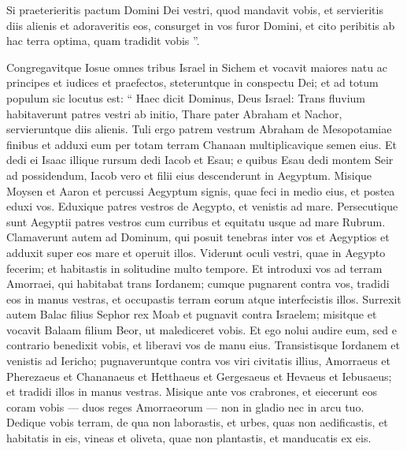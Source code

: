 \begin{biblechapter}
\begin{biblechapter}
\begin{biblechapter}
\begin{biblechapter}
\begin{biblechapter}
\begin{biblechapter}
\begin{biblechapter}
\begin{biblechapter}
\begin{biblechapter}
\begin{biblechapter}
\begin{biblechapter}
\begin{biblechapter}
\begin{biblechapter}
\begin{biblechapter}
\begin{biblechapter}
\begin{biblechapter}
\begin{biblechapter}
\begin{biblechapter}
\begin{biblechapter}
\begin{biblechapter}
\begin{biblechapter}
\begin{biblechapter}
\begin{biblechapter}
 \verse Si praeterieritis pactum Domini Dei vestri, quod mandavit vobis, et servieritis diis alienis et adoraveritis eos, consurget in vos furor Domini, et cito peribitis ab hac terra optima, quam tradidit vobis ”.
 
\begin{biblechapter}
\verse Congregavitque Iosue omnes tribus Israel in Sichem et vocavit maiores natu ac principes et iudices et praefectos, steteruntque in conspectu Dei; 
\verse et ad totum populum sic locutus est: “ Haec dicit Dominus, Deus Israel: Trans fluvium habitaverunt patres vestri ab initio, Thare pater Abraham et Nachor, servieruntque diis alienis. 
\verse Tuli ergo patrem vestrum Abraham de Mesopotamiae finibus et adduxi eum per totam terram Chanaan multiplicavique semen eius. 
\verse Et dedi ei Isaac illique rursum dedi Iacob et Esau; e quibus Esau dedi montem Seir ad possidendum, Iacob vero et filii eius descenderunt in Aegyptum. 
\verse Misique Moysen et Aaron et percussi Aegyptum signis, quae feci in medio eius, et postea eduxi vos. 
\verse Eduxique patres vestros de Aegypto, et venistis ad mare. Persecutique sunt Aegyptii patres vestros cum curribus et equitatu usque ad mare Rubrum. 
\verse Clamaverunt autem ad Dominum, qui posuit tenebras inter vos et Aegyptios et adduxit super eos mare et operuit illos. Viderunt oculi vestri, quae in Aegypto fecerim; et habitastis in solitudine multo tempore. 
\verse Et introduxi vos ad terram Amorraei, qui habitabat trans Iordanem; cumque pugnarent contra vos, tradidi eos in manus vestras, et occupastis terram eorum atque interfecistis illos. 
\verse Surrexit autem Balac filius Sephor rex Moab et pugnavit contra Israelem; misitque et vocavit Balaam filium Beor, ut malediceret vobis. 
\verse Et ego nolui audire eum, sed e contrario benedixit vobis, et liberavi vos de manu eius.
 \verse Transistisque Iordanem et venistis ad Iericho; pugnaveruntque contra vos viri civitatis illius, Amorraeus et Pherezaeus et Chananaeus et Hetthaeus et Gergesaeus et Hevaeus et Iebusaeus; et tradidi illos in manus vestras. 
\verse Misique ante vos crabrones, et eiecerunt eos coram vobis — duos reges Amorraeorum — non in gladio nec in arcu tuo. 
\verse Dedique vobis terram, de qua non laborastis, et urbes, quas non aedificastis, et habitatis in eis, vineas et oliveta, quae non plantastis, et manducatis ex eis. 

\end{biblechapter}
\end{biblechapter}
\end{biblechapter}
\end{biblechapter}
\end{biblechapter}
\end{biblechapter}
\end{biblechapter}
\end{biblechapter}
\end{biblechapter}
\end{biblechapter}
\end{biblechapter}
\end{biblechapter}
\end{biblechapter}
\end{biblechapter}
\end{biblechapter}
\end{biblechapter}
\end{biblechapter}
\end{biblechapter}
\end{biblechapter}
\end{biblechapter}
\end{biblechapter}
\end{biblechapter}
\end{biblechapter}
\end{biblechapter}
